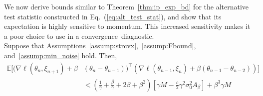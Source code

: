 \documentclass[conference]{IEEEtran}
\newcommand{\Ex}[1]{\mathbb{E}[ #1 ]}
\newenvironment{customthm}[1]
   {\renewcommand\theinnercustomthm{#1}\innercustomthm}
   {\endinnercustomthm}
\begin{document}
We now derive bounds similar to Theorem~\ref{thm:ip_exp_bd} 
for the alternative test statistic constructed in Eq.~(\ref{eq:alt_test_stat}), and show that its expectation is highly sensitive to momentum. 
This increased sensitivity makes it a poor choice to use in a convergence~diagnostic.\\

\begin{customthm}{\ref{thm:ip_opt}}
Suppose that Assumptions~\ref{assump:strcvx},~\ref{assump:Fbound}, and~\ref{assump:min_noise} hold. Then,
\begin{align*}
\Ex{ ( \nabla \ell ( \theta_n, \xi_{n+1}) + \beta & ( \theta_n - \theta_{n-1} ) )^\top ( \nabla \ell ( \theta_{n-1}, \xi_{n} ) + \beta ( \theta_{n-1} - \theta_{n-2} ) ) } \\
&< \left( \frac{1}{\gamma} + \frac{\beta}{\gamma} + 2 \beta + \beta^2 \right) \left[ \gamma M - \frac{c}{2} \gamma^2 \sigma_0^2 A_\beta \right]
+ \beta^3 \gamma M
\end{align*}
\end{customthm}
\end{document}
